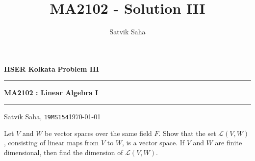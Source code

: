 \documentclass[10pt]{article}
\title{MA2102 - Solution III}
\author{Satvik Saha}
\date{}
\def\L{\mathcal{L}}
\begin{document}
        \par\textbf{IISER Kolkata} \hfill \textbf{Problem III}
        \vspace{3pt}
        \hrule
        \vspace{3pt}
        \begin{center}
                \LARGE{\textbf{MA2102 : Linear Algebra I}}
        \end{center}
        \vspace{3pt}
        \hrule
        \vspace{3pt}
        Satvik Saha, \texttt{19MS154}\hfill\today
        \vspace{20pt}

        Let $V$ and $W$ be vector spaces over the same field $F$.
        Show that the set $\L(V, W)$, consisting of linear maps from $V$ to $W$, is a vector space.
        If $V$ and $W$ are finite dimensional, then find the dimension of $\L(V, W)$.
\end{document}
